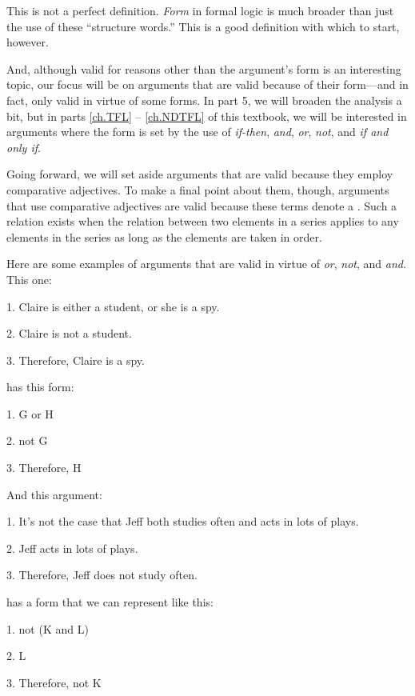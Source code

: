 \noindent This is not a perfect definition. \textit{Form} in formal logic is much broader than just the use of these ``structure words.'' This is a good definition with which to start, however.

And, although valid for reasons other than the argument's form is an interesting topic, our focus will be on arguments that are valid because of their form---and in fact, only valid in virtue of some forms. In part 5, we will broaden the analysis a bit, but in parts  \ref{ch.TFL} --  \ref{ch.NDTFL} of this textbook, we will be interested in arguments where the form is set by the use of  \textit{if-then}, \textit{and}, \textit{or}, \textit{not}, and \textit{if and only if}. 


\begin{notebox}
Going forward, we will set aside arguments that are valid because they employ comparative adjectives. To make a final point about them, though, arguments that use comparative adjectives are valid because these terms denote a . Such a relation exists when the relation between two elements in a series applies to any elements in the series as long as the elements are taken in order. 
\end{notebox}

Here are some examples of arguments that are valid in virtue of \textit{or}, \textit{not}, and \textit{and}.
This one:
	\begin{earg}
		\item[1.] Claire is either a student, or she is a spy.
		\item[2.] Claire is not a student.
		\item[3.] Therefore, Claire is a spy.
	\end{earg}
has this form:
	\begin{earg}
		\item[1.] G or H
		\item[2.] not G
		\item[3.] Therefore, H
	\end{earg}
And this argument:
	\begin{earg}
		\item[1.] It's not the case that Jeff both studies often and acts in lots of plays.
		\item[2.] Jeff acts in lots of plays.
		\item[3.] Therefore, Jeff does not study often.
	\end{earg}
has a form that we can represent like this:
	\begin{earg}
		\item[1.] not (K and L)
		\item[2.] L
		\item[3.] Therefore, not K
	\end{earg}

